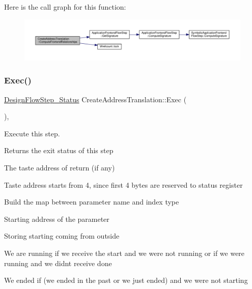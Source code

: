 Here is the call graph for this function\+:
\nopagebreak
\begin{figure}[H]
\begin{center}
\leavevmode
\includegraphics[width=350pt]{d1/d40/classCreateAddressTranslation_a3cabbb27cb880dfeb1c20aec7ada4a58_cgraph}
\end{center}
\end{figure}
\mbox{\label{classCreateAddressTranslation_a1213d1228ac3e336e8425ebacdf1ab60}} 
\subsubsection{\texorpdfstring{Exec()}{Exec()}}
{\footnotesize\ttfamily \hyperlink{design__flow__step_8hpp_afb1f0d73069c26076b8d31dbc8ebecdf}{Design\+Flow\+Step\+\_\+\+Status} Create\+Address\+Translation\+::\+Exec (\begin{DoxyParamCaption}{ }\end{DoxyParamCaption})\hspace{0.3cm}{\ttfamily [override]}, {\ttfamily [virtual]}}



Execute this step. 

\begin{DoxyReturn}{Returns}
the exit status of this step 
\end{DoxyReturn}
The taste address of return (if any)

Taste address starts from 4, since first 4 bytes are reserved to status register

Build the map between parameter name and index type

Starting address of the parameter

Storing starting coming from outside

We are running if we receive the start and we were not running or if we were running and we didn\textquotesingle{}t receive done

We ended if (we ended in the past or we just ended) and we were not starting

